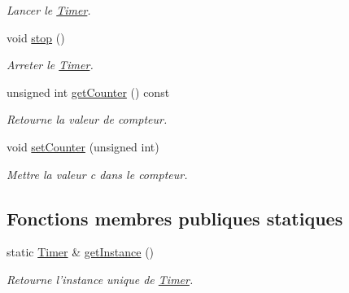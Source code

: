 \begin{DoxyCompactItemize}
\begin{DoxyCompactList}\small\item\em Lancer le \hyperlink{classTimer}{Timer}. \end{DoxyCompactList}\item 
\hypertarget{classTimer_a63f0eb44b27402196590a03781515dba}{void \hyperlink{classTimer_a63f0eb44b27402196590a03781515dba}{stop} ()}\label{classTimer_a63f0eb44b27402196590a03781515dba}

\begin{DoxyCompactList}\small\item\em Arreter le \hyperlink{classTimer}{Timer}. \end{DoxyCompactList}\item 
\hypertarget{classTimer_a03ffd75bbb89ff1644839523af9fda03}{unsigned int \hyperlink{classTimer_a03ffd75bbb89ff1644839523af9fda03}{get\-Counter} () const }\label{classTimer_a03ffd75bbb89ff1644839523af9fda03}

\begin{DoxyCompactList}\small\item\em Retourne la valeur de compteur. \end{DoxyCompactList}\item 
\hypertarget{classTimer_a7394d4c4edb4d951dbe2c7e1ab2fb7ae}{void \hyperlink{classTimer_a7394d4c4edb4d951dbe2c7e1ab2fb7ae}{set\-Counter} (unsigned int)}\label{classTimer_a7394d4c4edb4d951dbe2c7e1ab2fb7ae}

\begin{DoxyCompactList}\small\item\em Mettre la valeur c dans le compteur. \end{DoxyCompactList}\end{DoxyCompactItemize}
\subsection*{Fonctions membres publiques statiques}
\begin{DoxyCompactItemize}
\item 
\hypertarget{classTimer_a8357f90f20707f9693fc713319de923a}{static \hyperlink{classTimer}{Timer} \& \hyperlink{classTimer_a8357f90f20707f9693fc713319de923a}{get\-Instance} ()}\label{classTimer_a8357f90f20707f9693fc713319de923a}

\begin{DoxyCompactList}\small\item\em Retourne l'instance unique de \hyperlink{classTimer}{Timer}. \end{DoxyCompactList}\end{DoxyCompactItemize}


